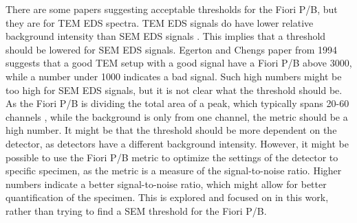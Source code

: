 There are some papers suggesting acceptable thresholds for the Fiori P/B, but they are for TEM EDS spectra.
TEM EDS signals do have lower relative background intensity than SEM EDS signals .
This implies that a threshold should be lowered for SEM EDS signals.
Egerton and Chengs paper from 1994 \cite{egerton_nio_characterization_1994} suggests that a good TEM setup with a good signal have a Fiori P/B above 3000, while a number under 1000 indicates a bad signal.
Such high numbers might be too high for SEM EDS signals, but it is not clear what the threshold should be.
As the Fiori P/B is dividing the total area of a peak, which typically spans 20-60 channels , while the background is only from one channel, the metric should be a high number.
It might be that the threshold should be more dependent on the detector, as detectors have a different background intensity.
However, it might be possible to use the Fiori P/B metric to optimize the settings of the detector to specific specimen, as the metric is a measure of the signal-to-noise ratio.
Higher numbers indicate a better signal-to-noise ratio, which might allow for better quantification of the specimen.
This is explored and focused on in this work, rather than trying to find a SEM threshold for the Fiori P/B.







